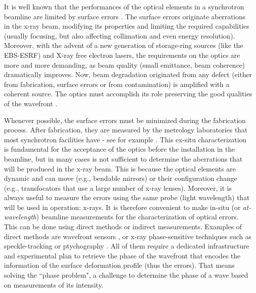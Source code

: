 \documentclass{iucr}
\newcommand{\inred}[1]{{\color{black}#1}}
\begin{document}
It is well known that the performances of the optical elements in  a synchrotron beamline are limited by surface errors \inred{\cite{Yabashi2014, Schroer2014, Cocco2022}}. The surface errors originate aberrations in the x-ray beam, modifying its properties and limiting the required capabilities (usually focusing, but also affecting collimation and even energy resolution). Moreover, with the advent of a new generation of storage-ring sources (like the EBS-ESRF) and X-ray free electron lasers, the requirements on the optics are more and more demanding, as beam quality (small emittance, beam coherence) dramatically improves. Now, beam degradation originated \inred{from} any defect (either from fabrication, surface errors or from contamination) is amplified with a coherent source. The optics must accomplish its role preserving the good qualities of the wavefront \cite{Cocco2022}. 

Whenever possible, the surface errors must be minimized during the fabrication process. After fabrication, they are measured by the metrology laboratories that most synchrotron facilities have - \inred{see for example \cite{round_robin1, round_robin2, round_robin3}}. This ex-situ characterization is fundamental for the \inred{acceptance} of the optics \inred{before} the installation in the beamline, but in many cases \inred{is} not sufficient to determine the aberrations that will \inred{be produced} in the x-ray beam. This is because the optical elements are dynamic and can move (e.g., bendable \inred{mirrors}) or their configuration change (e.g., transfocators that use a large number of x-ray lenses). Moreover, it is always useful to measure the errors using the same probe (light wavelength) that will be used in operation: x-rays. It is therefore convenient to make in-situ (or \textit{at-wavelength}) beamline measurements for the characterization of optical errors. \inred{This can be done using direct methods or indirect measurements. Examples of direct methods are} wavefront sensors \inred{\cite{Mercere2005, Mikhaylov2020}, or x-ray phase-sensitive techniques such as speckle-tracking \cite{berujon_theory_2020, berujon_experiments_2020} or ptychography \cite{Schropp2013}}. \inred{All of them require a dedicated infrastructure and experimental plan \inred{to retrieve the phase of the wavefront that encodes the information of the surface deformation profile (thus the errors)}. That means solving the ``phase problem", a challenge to determine the phase of a wave based on measurements of its intensity.}
\end{document}
